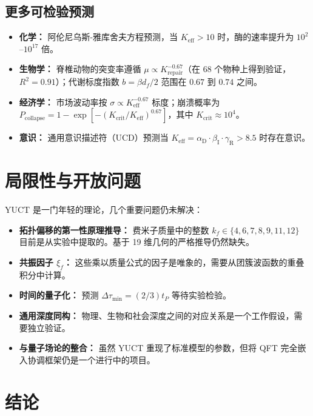 \documentclass[11pt]{article}
\theoremstyle{remark}
\newcommand{\Keff}{K_{\mathrm{eff}}}
\newcommand{\alD}{\alpha_{\mathrm{D}}}
\newcommand{\beI}{\beta_{\mathrm{I}}}
\newcommand{\gaR}{\gamma_{\mathrm{R}}}
\begin{document}
	\subsection{更多可检验预测}
	
	\begin{itemize}
		\item \textbf{化学：} 阿伦尼乌斯-雅库舍夫方程预测，当 \(\Keff > 10\) 时，酶的速率提升为 \(10^2\)–\(10^{17}\) 倍。
		\item \textbf{生物学：} 脊椎动物的突变率遵循 \(\mu \propto K_{\text{repair}}^{-0.67}\)（在 68 个物种上得到验证，\(R^2=0.91\)）；代谢标度指数 \(b = \beta d_f/2\) 范围在 \(0.67\) 到 \(0.74\) 之间。
		\item \textbf{经济学：} 市场波动率按 \(\sigma \propto \Keff^{-0.67}\) 标度；崩溃概率为 \(P_{\text{collapse}} = 1 - \exp[-(K_{\text{crit}}/\Keff)^{0.67}]\)，其中 \(K_{\text{crit}} \approx 10^4\)。
		\item \textbf{意识：} 通用意识描述符（UCD）预测当 \(\Keff = \alD \cdot \beI \cdot \gaR > 8.5\) 时存在意识。
	\end{itemize}
	
	\section{局限性与开放问题}
	\label{sec:limitations}
	
	YUCT 是一门年轻的理论，几个重要问题仍未解决：
	\begin{itemize}
		\item \textbf{拓扑偏移的第一性原理推导：} 费米子质量中的整数 \(k_f \in \{4,6,7,8,9,11,12\}\) 目前是从实验中提取的。基于 19 维几何的严格推导仍然缺失。
		\item \textbf{共振因子 \(\xi_f\)：} 这些乘以质量公式的因子是唯象的，需要从团簇波函数的重叠积分中计算。
		\item \textbf{时间的量子化：} 预测 \(\Delta\tau_{\min} = (2/3) t_P\) 等待实验检验。
		\item \textbf{通用深度同构：} 物理、生物和社会深度之间的对应关系是一个工作假设，需要独立验证。
		\item \textbf{与量子场论的整合：} 虽然 YUCT 重现了标准模型的参数，但将 QFT 完全嵌入协调框架仍是一个进行中的项目。
	\end{itemize}
	
	\section{结论}
	\label{sec:conclusion}
	
\end{document}
